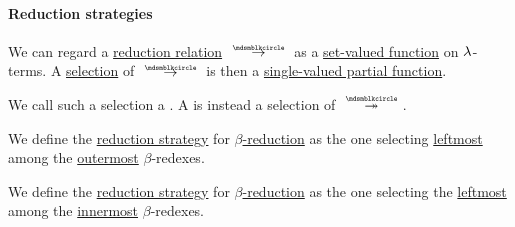 \paragraph{Reduction strategies}

\begin{definition}\label{def:reduction_strategy}
  We can regard a \hyperref[def:lambda_reduction]{reduction relation} \( {\pred} \) as a \hyperref[def:set_valued_map]{set-valued function} on \( \mathrm{\lambda} \)-terms. A \hyperref[def:function/selection]{selection} of \( {\pred} \) is then a \hyperref[def:set_valued_map/partial]{single-valued partial function}.

  We call such a selection a . A  is instead a selection of \( {\pred*} \).
\end{definition}

\begin{definition}\label{def:normal_order_reduction}
  We define the  \hyperref[def:reduction_strategy]{reduction strategy} for \hyperref[def:beta_eta_reduction]{\( \beta \)-reduction} as the one selecting \hyperref[def:subterm_occurrence_ordering/horizontal]{leftmost} among the \hyperref[def:subterm_occurrence_ordering/vertical]{outermost} \( \beta \)-redexes.
\end{definition}

\begin{definition}\label{def:applicative_order_reduction}
  We define the  \hyperref[def:reduction_strategy]{reduction strategy} for \hyperref[def:beta_eta_reduction]{\( \beta \)-reduction} as the one selecting the \hyperref[def:subterm_occurrence_ordering/horizontal]{leftmost} among the \hyperref[def:subterm_occurrence_ordering/vertical]{innermost} \( \beta \)-redexes.
\end{definition}

